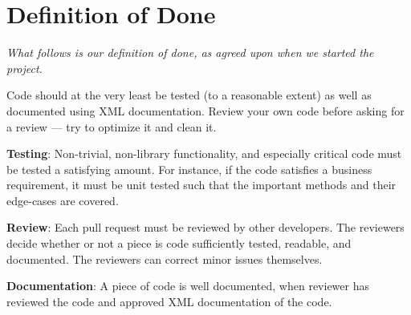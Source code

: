 \section{Definition of Done}\label{sec:definitionOfDone}
\textit{What follows is our definition of done, as agreed upon when we started the project.}

Code should at the very least be tested (to a reasonable extent) as well as documented using XML documentation. Review your own code before asking for a review --- try to optimize it and clean it.

\textbf{Testing}: Non-trivial, non-library functionality, and especially critical code must be tested a satisfying amount. For instance, if the code satisfies a business requirement, it must be unit tested such that the important methods and their edge-cases are covered.  

\textbf{Review}: Each pull request must be reviewed by other developers. The reviewers decide whether or not a piece is code sufficiently tested, readable, and documented. The reviewers can correct minor issues themselves. 

\textbf{Documentation}: A piece of code is well documented, when reviewer has reviewed the code and approved XML documentation of the code.
